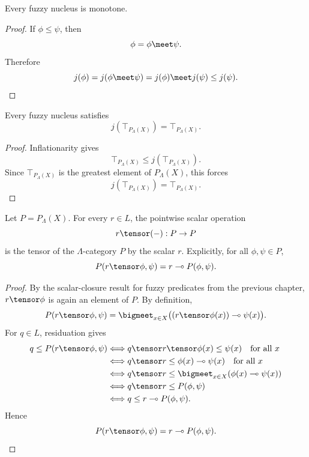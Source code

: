 \begin{lemma}
\label{lem:fuzzy-nuclei-monotone}
Every fuzzy nucleus is monotone.
\end{lemma}

\begin{proof}
If \(\phi\leq\psi\), then
\[
    \phi=\phi\meet\psi.
\]
Therefore
\[
    j(\phi)
    =
    j(\phi\meet\psi)
    =
    j(\phi)\meet j(\psi)
    \leq
    j(\psi).
\]
\end{proof}

\begin{lemma}
\label{lem:fuzzy-nuclei-preserve-top}
Every fuzzy nucleus satisfies
\[
    j(\top_{P_\Lambda(X)})=\top_{P_\Lambda(X)}.
\]
\end{lemma}

\begin{proof}
Inflationarity gives
\[
    \top_{P_\Lambda(X)}\leq j(\top_{P_\Lambda(X)}).
\]
Since \(\top_{P_\Lambda(X)}\) is the greatest element of \(P_\Lambda(X)\), this
forces
\[
    j(\top_{P_\Lambda(X)})=\top_{P_\Lambda(X)}.
\]
\end{proof}

\begin{lemma}
\label{lem:scalars-as-enriched-tensors}
Let \(P=P_\Lambda(X)\). For every \(r\in L\), the pointwise scalar operation
\[
    r\tensor(-):P\to P
\]
is the tensor of the \(\Lambda\)-category \(P\) by the scalar \(r\). Explicitly, for
all \(\phi,\psi\in P\),
\[
    P(r\tensor\phi,\psi)
    =
    r\multimap P(\phi,\psi).
\]
\end{lemma}

\begin{proof}
By the scalar-closure result for fuzzy predicates from the previous chapter,
\(r\tensor\phi\) is again an element of \(P\). By definition,
\[
    P(r\tensor\phi,\psi)
    =
    \bigmeet_{x\in X}
    \bigl((r\tensor\phi(x))\multimap\psi(x)\bigr).
\]
For \(q\in L\), residuation gives
\[
\begin{aligned}
q\leq P(r\tensor\phi,\psi)
&\Longleftrightarrow
q\tensor r\tensor\phi(x)\leq\psi(x)
\quad\text{for all }x
\\
&\Longleftrightarrow
q\tensor r\leq \phi(x)\multimap\psi(x)
\quad\text{for all }x
\\
&\Longleftrightarrow
q\tensor r\leq
\bigmeet_{x\in X}(\phi(x)\multimap\psi(x))
\\
&\Longleftrightarrow
q\tensor r\leq P(\phi,\psi)
\\
&\Longleftrightarrow
q\leq r\multimap P(\phi,\psi).
\end{aligned}
\]
Hence
\[
    P(r\tensor\phi,\psi)
    =
    r\multimap P(\phi,\psi).
\]
\end{proof}

